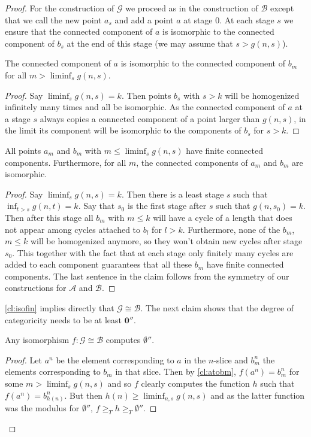 \documentclass{amsart}
\newcommand{\G}{\mathcal{G}}
\newcommand\+[1]{\mathcal{#1}}
\renewcommand\*[1]{\mathbf{#1}}
\renewcommand\=[1]{\text{#1}}
\renewcommand\*[1]{\mathbf{#1}}
\newcommand{\A}{\mathcal{A}}
\newcommand{\B}{\mathcal{B}}
\begin{document}
\begin{proof}
   For the construction of $\G$ we proceed as in the construction of $\B$ except that we call the new point $a_s$ and add a point $a$ at stage $0$. At each stage $s$ we ensure that the connected component of $a$ is isomorphic to the connected component of $b_s$ at the end of this stage (we may assume that $s>g(n,s)$).
   \begin{claim}\label{cl:atobm}
     The connected component of $a$ is isomorphic to the connected component of $b_m$ for all $m>\liminf_s g(n,s)$.
   \end{claim}
   \begin{proof}
     Say $\liminf_s g(n,s)=k$. Then points $b_s$ with $s>k$ will be homogenized infinitely many times and all be isomorphic. As the connected component of $a$ at a stage $s$ always copies a connected component of a point larger than $g(n,s)$, in the limit its component will be isomorphic to the components of $b_s$ for $s>k$.
   \end{proof}
   \begin{claim}\label{cl:isofin}
     All points $a_m$ and $b_m$ with $m\leq \liminf_s g(n,s)$ have finite connected components. 
     Furthermore, for all $m$, the connected components of $a_m$ and $b_m$ are isomorphic.
   \end{claim}
   \begin{proof}
     Say $\liminf_s g(n,s)=k$. Then there is a least stage $s$ such that $\inf_{t>s} g(n,t)= k$. Say that $s_0$ is the first stage after $s$ such that $g(n,s_0)=k$. Then after this stage all $b_m$ with $m\leq k$ will have a cycle of a length that does not appear among cycles attached to $b_l$ for $l>k$. Furthermore, none of the $b_m$, $m\leq k$ will be homogenized anymore, so they won't obtain new cycles after stage $s_0$. This together with the fact that at each stage only finitely many cycles are added to each component guarantees that all these $b_m$ have finite connected components.
     The last sentence in the claim follows from the symmetry of our constructions for $\A$ and $\B$.  
   \end{proof}
   \cref{cl:isofin} implies directly that $\G\cong \B$. The next claim shows that the degree of categoricity needs to be at least $\mathbf 0''$. 
   \begin{claim}
   Any isomorphism $f:\G\cong \B$ computes $\emptyset''$.
 \end{claim}
 \begin{proof}
 Let $a^n$ be the element corresponding to $a$ in the $n$-slice and $b^n_m$ the elements corresponding to $b_m$ in that slice. Then by \cref{cl:atobm}, $f(a^n)=b_m^n$ for some $m>\liminf_s g(n,s)$ and so $f$ clearly computes the function $h$ such that $f(a^n)=b_{h(n)}^n$. But then $h(n)\geq \liminf_{n,s} g(n,s)$ and as the latter function was the modulus for $\emptyset''$, $f\geq_T h\geq_T \emptyset''$.

\end{proof}
\end{proof}
\end{document}
